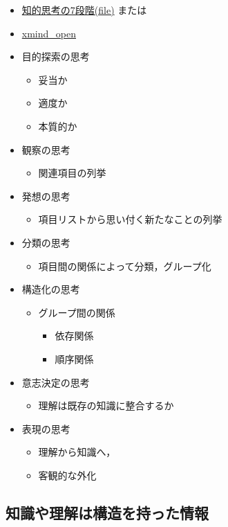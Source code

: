 \documentclass[dvipdfmx,11pat]{jarticle}
\begin{document}
\begin{itemize}
\item \href{../Maps/知的思考の7段階.xmind}{知的思考の7段階(file)} または
\item \href{shell:open ../Maps/知的思考の7段階.xmind}{xmind\_open}

\item 目的探索の思考
\begin{itemize}
\item 妥当か
\item 適度か
\item 本質的か
\end{itemize}
\item 観察の思考
\begin{itemize}
\item 関連項目の列挙
\end{itemize}
\item 発想の思考
\begin{itemize}
\item 項目リストから思い付く新たなことの列挙
\end{itemize}
\item 分類の思考
\begin{itemize}
\item 項目間の関係によって分類，グループ化
\end{itemize}
\item 構造化の思考
\begin{itemize}
\item グループ間の関係
\begin{itemize}
\item 依存関係
\item 順序関係
\end{itemize}
\end{itemize}
\item 意志決定の思考
\begin{itemize}
\item 理解は既存の知識に整合するか
\end{itemize}
\item 表現の思考
\begin{itemize}
\item 理解から知識へ，
\item 客観的な外化
\end{itemize}
\end{itemize}
\subsection{知識や理解は構造を持った情報}
\label{sec:org47139e6}
\end{document}

